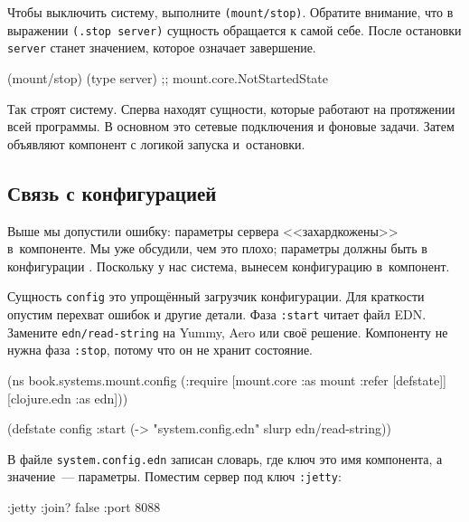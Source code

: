 Чтобы выключить систему, выполните \verb|(mount/stop)|. Обратите внимание, что
в выражении \verb|(.stop server)| сущность обращается к самой себе. После
остановки \verb|server| станет значением, которое означает завершение.

\begin{english}
  \begin{clojure}
(mount/stop)
(type server)
;; mount.core.NotStartedState
  \end{clojure}
\end{english}

Так строят систему. Сперва находят сущности, которые работают на протяжении всей
программы. В основном это сетевые подключения и фоновые задачи. Затем объявляют
компонент с логикой запуска и~остановки.

\subsection{Связь с конфигурацией}

Выше мы допустили ошибку: параметры сервера <<захардкожены>> в~компоненте. Мы
уже обсудили, чем это плохо; параметры должны быть в
конфигурации . Поскольку у нас система, вынесем конфигурацию
в~компонент.


Сущность \verb|config| это упрощённый загрузчик конфигурации. Для краткости
опустим перехват ошибок и другие детали. Фаза \verb|:start| читает файл
EDN. Замените \verb|edn/read-string| на Yummy, Aero или своё
решение. Компоненту не нужна фаза \verb|:stop|, потому что он не хранит
состояние.

\begin{english}
  \begin{clojure}
(ns book.systems.mount.config
  (:require
   [mount.core :as mount :refer [defstate]]
   [clojure.edn :as edn]))

(defstate config
  :start
  (-> "system.config.edn"
      slurp
      edn/read-string))
  \end{clojure}
\end{english}

В файле \verb|system.config.edn| записан словарь, где ключ это имя компонента, а
значение~--- параметры. Поместим сервер под ключ \verb|:jetty|:

\begin{english}
  \begin{clojure}
{:jetty {:join? false :port 8088}}
  \end{clojure}
\end{english}

